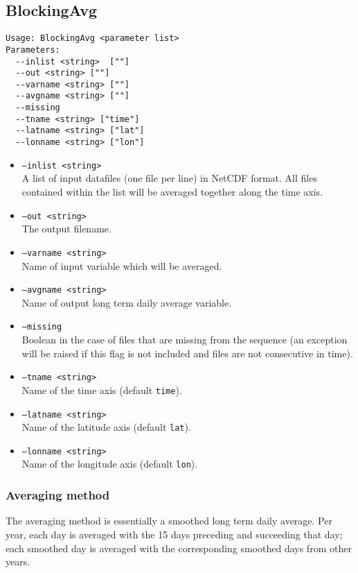 \documentclass{article}
\begin{document}
\subsection{BlockingAvg}\label{bavg}
\begin{verbatim}
Usage: BlockingAvg <parameter list>
Parameters:
  --inlist <string>  [""]
  --out <string> [""]
  --varname <string> [""]
  --avgname <string> [""]
  --missing
  --tname <string> ["time"]
  --latname <string> ["lat"]
  --lonname <string> ["lon"]
\end{verbatim}

\begin{itemize}
\item[]\texttt{--inlist <string>} \\ A list of input datafiles (one file per line) in NetCDF format. All files contained within the list will be averaged together along the time axis.
\item[] \texttt{--out <string>}\\ The output filename.
\item[] \texttt{--varname <string>}\\ Name of input variable which will be averaged.
\item[]\texttt{--avgname <string>}\\Name of output long term daily average variable.
\item[]\texttt{--missing}\\ Boolean in the case of files that are missing from the sequence (an exception will be raised if this flag is not included and files are not consecutive in time).
\item[] \texttt{--tname <string>}\\Name of the time axis (default \texttt{time}).
\item[]\texttt{--latname <string>}\\Name of the latitude axis (default \texttt{lat}).
\item[]\texttt{--lonname <string>}\\Name of the longitude axis (default \texttt{lon}).
\end{itemize}

\subsubsection{Averaging method}
The averaging method is essentially a smoothed long term daily average. Per year, each day is averaged with the 15 days preceding and succeeding that day; each smoothed day is averaged with the corresponding smoothed days from other years. 
\end{document}

